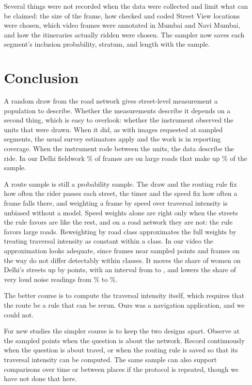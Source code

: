 \documentclass[11pt]{article}
\begin{document}
Several things were not recorded when the data were collected and limit what can be claimed: the size of the frame, how checked and coded Street View locations were chosen, which video frames were annotated in Mumbai and Navi Mumbai, and how the itineraries actually ridden were chosen. The sampler now saves each segment's inclusion probability, stratum, and length with the sample.

\section{Conclusion}

A random draw from the road network gives street-level measurement a population to describe. Whether the measurements describe it depends on a second thing, which is easy to overlook: whether the instrument observed the units that were drawn. When it did, as with images requested at sampled segments, the usual survey estimators apply and the work is in reporting coverage. When the instrument rode between the units, the data describe the ride. In our Delhi fieldwork \framemajorDelhi\% of frames are on large roads that make up \samplemajorDelhi\% of the sample.

A route sample is still a probability sample. The draw and the routing rule fix how often the rider passes each street, the timer and the speed fix how often a frame falls there, and weighting a frame by speed over traversal intensity is unbiased without a model. Speed weights alone are right only when the streets the rule favors are like the rest, and on a road network they are not: the rule favors large roads. Reweighting by road class approximates the full weights by treating traversal intensity as constant within a class. In our video the approximation looks adequate, since frames near sampled points and frames on the way do not differ detectably within classes. It moves the share of women on Delhi's streets up by \shiftDelhi{} points, with an interval from \shiftlowDelhi{} to \shifthighDelhi, and lowers the share of very loud noise readings from \noiseasreadmaxatleastOneZeroZero\% to \noiseroadnetworkmaxatleastOneZeroZero\%.

The better course is to compute the traversal intensity itself, which requires that the route be a rule that can be rerun. Ours was a navigation application, and we could not.

For new studies the simpler course is to keep the two designs apart. Observe at the sampled points when the question is about the network. Record continuously when the question is about travel, or when the routing rule is saved so that its traversal intensity can be computed. The same sample can also support comparisons over time or between places if the protocol is repeated, though we have not done that here.

\clearpage


\end{document}
